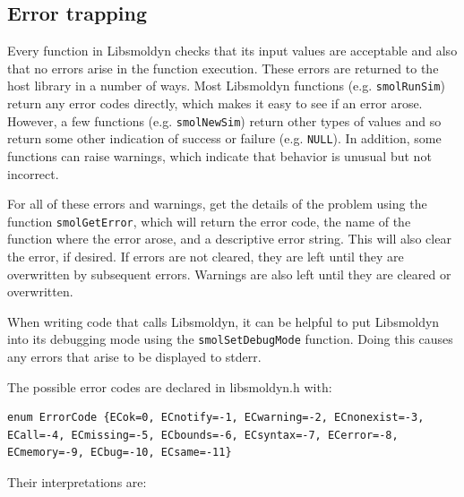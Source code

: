 \documentclass {scrbook}
\newcommand {\ttt} {\texttt}
\begin{document}
\subsection*{Error trapping}

Every function in Libsmoldyn checks that its input values are acceptable and also that no errors arise in the function execution. These errors are returned to the host library in a number of ways. Most Libsmoldyn functions (e.g. \ttt{smolRunSim}) return any error codes directly, which makes it easy to see if an error arose. However, a few functions (e.g. \ttt{smolNewSim}) return other types of values and so return some other indication of success or failure (e.g. \ttt{NULL}). In addition, some functions can raise warnings, which indicate that behavior is unusual but not incorrect.

For all of these errors and warnings, get the details of the problem using the function \ttt{smolGetError}, which will return the error code, the name of the function where the error arose, and a descriptive error string. This will also clear the error, if desired. If errors are not cleared, they are left until they are overwritten by subsequent errors. Warnings are also left until they are cleared or overwritten.

When writing code that calls Libsmoldyn, it can be helpful to put Libsmoldyn into its debugging mode using the \ttt{smolSetDebugMode} function. Doing this causes any errors that arise to be displayed to stderr.

The possible error codes are declared in libsmoldyn.h with:

\begin{lstlisting}[style=SSAC]
enum ErrorCode {ECok=0, ECnotify=-1, ECwarning=-2, ECnonexist=-3, ECall=-4, ECmissing=-5, ECbounds=-6, ECsyntax=-7, ECerror=-8, ECmemory=-9, ECbug=-10, ECsame=-11}
\end{lstlisting}

Their interpretations are:
\end{document}
